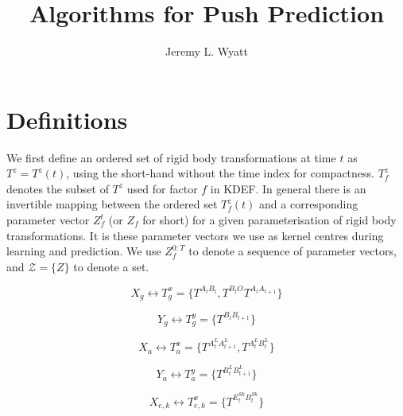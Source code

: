 \documentclass[11pt]{article} %
\title{Algorithms for Push Prediction}
\author{Jeremy L. Wyatt}
\begin{document}
\maketitle

\section{Definitions}

We first define an ordered set of rigid body transformations at time $t$ as $T^{z} = T^{z}(t)$, using the short-hand without the time index for compactness. $T^{z}_f$ denotes the subset of $T^{z}$ used for factor $f$ in KDEF. In general there is an invertible mapping between the ordered set $T^{z}_{f}(t)$ and a corresponding parameter vector $Z^t_{f}$ (or $Z_{f}$ for short) for a given parameterisation of rigid body transformations. It is these parameter vectors we use as kernel centres during learning and prediction.  We use $Z^{0:T}_{f}$ to denote a sequence of parameter vectors, and $\mathcal{Z} = \{Z\}$ to denote a set.

%

\begin{equation}
X_g \leftrightarrow T^{x}_g = \{ T^{A_{t}B_{t}},  T^{B_{t}O} T^{A_{t}A_{t+1}} \} 
\end{equation}

\begin{equation}
Y_g \leftrightarrow T^{y}_g = \{ T^{B_{t}B_{t+1}} \}
\end{equation}

\begin{equation}
X_a \leftrightarrow T^{x}_a = \{ T^{A^L_{t}A^L_{t+1}}, T^{A^L_{t}B^L_{t}} \} 
\end{equation}

\begin{equation}
Y_a \leftrightarrow T^{y}_a  = \{ T^{B^L_{t}B^L_{t+1}} \}
\end{equation}

\begin{equation}
X_{e,k} \leftrightarrow T^{x}_{e,k} = \{ T^{E^{Sk}_{t}B^{Sk}_{t}} \} 
\end{equation}
\end{document}
